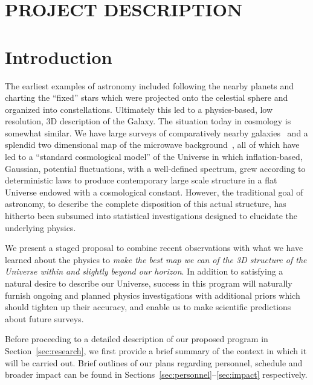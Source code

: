 \documentclass[psfig,12pt]{article}
\def\ni{\noindent}
\begin{document}
\section*{PROJECT DESCRIPTION}


\section{Introduction}
\label{sec:intro}

\ni{\bf Mapping Our Universe:}
The earliest examples of astronomy included following the nearby planets
and charting the ``fixed'' stars which were projected onto the celestial
sphere and organized into constellations. Ultimately this led to a
physics-based, low resolution,  3D description of the Galaxy. The
situation today in cosmology is somewhat similar. We have large surveys
of comparatively nearby galaxies~\cite{Kaiser2002, Ivezc2002, Davis2003,
Giavalisco2004, DES2005, Faber2007, Scoville2007,
Kaiser2010, Blake2011, Alam2015} and a splendid
two dimensional map of the microwave background~\cite{Planck2015maps},
all of which have led to a ``standard cosmological model'' of the
Universe in which
inflation-based, Gaussian, potential fluctuations, with a well-defined
spectrum, grew according to deterministic laws to produce contemporary
large scale structure in a flat Universe endowed with a cosmological
constant. However, the traditional goal of astronomy, to describe the
complete disposition of this actual structure, has hitherto been
subsumed into statistical investigations designed to elucidate the
underlying physics.

We present a staged proposal to combine recent observations with what we
have learned about the physics to {\it make the best map we can of the 3D
structure of the Universe within and slightly beyond our horizon}. In
addition to satisfying a natural desire to describe our Universe,
success in this program will naturally furnish ongoing and planned
physics investigations with additional priors which should tighten up
their accuracy, and enable us to make scientific predictions about
future surveys.

Before proceeding to a detailed description of our proposed program in
Section~\ref{sec:research}, we first provide a brief summary of the
context in which it will be carried out. Brief outlines of our plans
regarding personnel, schedule and broader impact can be found in
Sections~\ref{sec:personnel}--\ref{sec:impact} respectively.
\vspace{\baselineskip}
\end{document}
